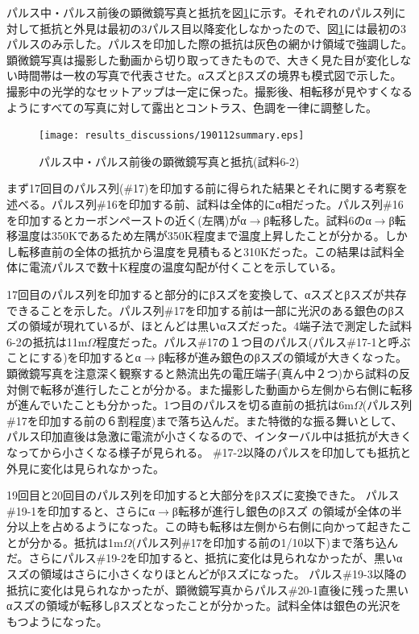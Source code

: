 パルス中・パルス前後の顕微鏡写真と抵抗を図\ref{fig:190112summary}に示す。それぞれのパルス列に対して抵抗と外見は最初の3パルス目以降変化しなかったので、図\ref{fig:190112summary}には最初の3パルスのみ示した。パルスを印加した際の抵抗は灰色の網かけ領域で強調した。顕微鏡写真は撮影した動画から切り取ってきたもので、大きく見た目が変化しない時間帯は一枚の写真で代表させた。αスズとβスズの境界も模式図で示した。撮影中の光学的なセットアップは一定に保った。撮影後、相転移が見やすくなるようにすべての写真に対して露出とコントラス、色調を一律に調整した。
\begin{landscape}
\begin{figure}[!h]
    \begin{center}
   \texttt{[image: results\_discussions/190112summary.eps]}
  \end{center}
    \caption{パルス中・パルス前後の顕微鏡写真と抵抗(試料6-2)}
  \label{fig:190112summary}
\end{figure}
\end{landscape}

まず17回目のパルス列(\#17)を印加する前に得られた結果とそれに関する考察を述べる。パルス列\#16を印加する前、試料は全体的にα相だった。パルス列\#16を印加するとカーボンペーストの近く(左隅)がα$\to$β転移した。試料6のα$\to$β転移温度は350Kであるため左隅が350K程度まで温度上昇したことが分かる。しかし転移直前の全体の抵抗から温度を見積もると310Kだった。この結果は試料全体に電流パルスで数十K程度の温度勾配が付くことを示している。

17回目のパルス列を印加すると部分的にβスズを変換して、αスズとβスズが共存できることを示した。パルス列\#17を印加する前は一部に光沢のある銀色のβスズの領域が現れているが、ほとんどは黒いαスズだった。4端子法で測定した試料6-2の抵抗は11m$\Omega$程度だった。パルス\#17の１つ目のパルス(パルス\#17-1と呼ぶことにする)を印加するとα$\to$β転移が進み銀色のβスズの領域が大きくなった。顕微鏡写真を注意深く観察すると熱流出先の電圧端子(真ん中２つ)から試料の反対側で転移が進行したことが分かる。また撮影した動画から左側から右側に転移が進んでいたことも分かった。1つ目のパルスを切る直前の抵抗は6m$\Omega$(パルス列\#17を印加する前の６割程度)まで落ち込んだ。また特徴的な振る舞いとして、パルス印加直後は急激に電流が小さくなるので、インターバル中は抵抗が大きくなってから小さくなる様子が見られる。
\#17-2以降のパルスを印加しても抵抗と外見に変化は見られなかった。

19回目と20回目のパルス列を印加すると大部分をβスズに変換できた。
パルス\#19-1を印加すると、さらにα$\to$β転移が進行し銀色のβスズ
の領域が全体の半分以上を占めるようになった。この時も転移は左側から右側に向かって起きたことが分かる。抵抗は1m$\Omega$(パルス列\#17を印加する前の1/10以下)まで落ち込んだ。さらにパルス\#19-2を印加すると、抵抗に変化は見られなかったが、黒いαスズの領域はさらに小さくなりほとんどがβスズになった。
パルス\#19-3以降の抵抗に変化は見られなかったが、顕微鏡写真からパルス\#20-1直後に残った黒いαスズの領域が転移しβスズとなったことが分かった。試料全体は銀色の光沢をもつようになった。

